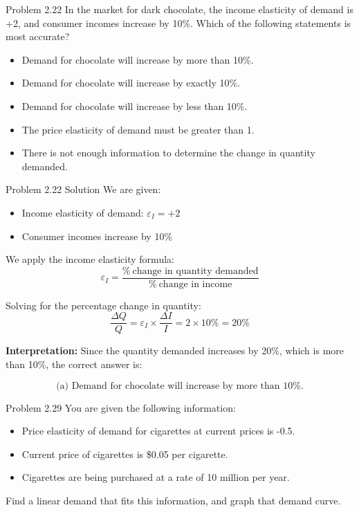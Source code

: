 \documentclass{beamer}
\theoremstyle{plain} %
\theoremstyle{definition} %
\begin{document}
\begin{frame}{Problem 2.22}
    In the market for dark chocolate, the income elasticity of demand is +2, and consumer incomes increase by 10\%. Which of the following statements is most accurate?

\begin{itemize}
    \item[a)] Demand for chocolate will increase by more than 10\%.
    \item[b)] Demand for chocolate will increase by exactly 10\%.
    \item[c)] Demand for chocolate will increase by less than 10\%.
    \item[d)] The price elasticity of demand must be greater than 1.
    \item[e)] There is not enough information to determine the change in quantity demanded.
\end{itemize}
\end{frame}

\begin{frame}{Problem 2.22 Solution}
    We are given:

\begin{itemize}
  \item Income elasticity of demand: \( \varepsilon_I = +2 \)
  \item Consumer incomes increase by 10\%
\end{itemize}

We apply the income elasticity formula:
\[
\varepsilon_I = \frac{\%\ \text{change in quantity demanded}}{\%\ \text{change in income}}
\]

Solving for the percentage change in quantity:
\[
\frac{\Delta Q}{Q} = \varepsilon_I \times \frac{\Delta I}{I} = 2 \times 10\% = 20\%
\]

\textbf{Interpretation:}  
Since the quantity demanded increases by 20\%, which is more than 10\%, the correct answer is:

\[
\boxed{\text{(a) Demand for chocolate will increase by more than 10\%.}}
\]

\end{frame}




\begin{frame}{Problem 2.29}
    You are given the following information:

\begin{itemize}
\item Price elasticity of demand for cigarettes at current prices is -0.5.
\item Current price of cigarettes is \$0.05 per cigarette.
\item Cigarettes are being purchased at a rate of 10 million per year.
\end{itemize}


Find a linear demand that fits this information, and graph
that demand curve.
\end{frame}
\end{document}
